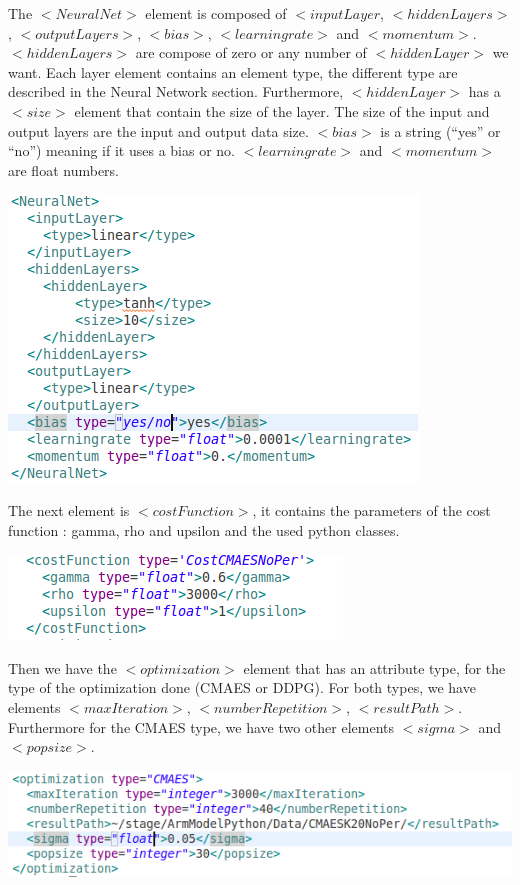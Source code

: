 \documentclass[a4paper]{article}
\begin{document}
The $<NeuralNet>$ element is composed of $<inputLayer$, $<hiddenLayers>$, $<outputLayers>$, $<bias>$, $<learningrate>$ and $<momentum>$.
$<hiddenLayers>$ are compose of zero or any number of $<hiddenLayer>$ we want. 
Each layer element contains an element type, the different type are described in the Neural Network section. 
Furthermore, $<hiddenLayer>$ has a $<size>$ element that contain the size of the layer. 
The size of the input and output layers are the input and output data size.
$<bias>$ is a string (``yes'' or ``no'') meaning if it uses a bias or no. 
$<learningrate>$ and $<momentum>$ are float numbers.
\begin{flushleft}
\includegraphics[scale=0.5]{XMLNeuralNet.png}
\end{flushleft}
The next element is $<costFunction>$, it contains the parameters of the cost function : gamma, rho and upsilon and the used python classes.
\begin{flushleft}
\includegraphics[scale=0.5]{XMLCost.png}
\end{flushleft}
Then we have the $<optimization>$ element that has an attribute type, for the type of the optimization done (CMAES or DDPG). 
For both types, we have elements $<maxIteration>$, $<numberRepetition>$, $<resultPath>$.
Furthermore for the CMAES type, we have two other elements $<sigma>$ and $<popsize>$.
\begin{flushleft}
\includegraphics[scale=0.5]{XMLOpti.png}
\end{flushleft}
\end{document}
